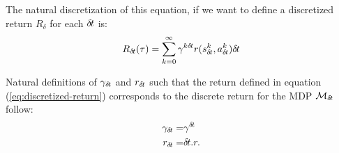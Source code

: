 The natural discretization of this equation, if we want to define a discretized
return $R_\delta$ for each ${\delta\hspace{-.1em}t}$ is:
\begin{equation}
\label{eq:discretized-return}
R_{\delta\hspace{-.1em}t}(\tau) = \sum_{k=0}^\infty\gamma^{k{\delta\hspace{-.1em}t}}
r(s_{\delta\hspace{-.1em}t}^k, a_{\delta\hspace{-.1em}t}^k){\delta\hspace{-.1em}t}
\end{equation}

Natural definitions of $\gamma_{\delta\hspace{-.1em}t}$ and $r_{\delta\hspace{-.1em}t}$ such
that the return defined in equation (\ref{eq:discretized-return}) corresponds
to the discrete return for the MDP ${\cal M}_{\delta\hspace{-.1em}t}$ follow:
\begin{align}
\label{eq:def-gamma}
\gamma_{\delta\hspace{-.1em}t} =& \gamma^{\delta\hspace{-.1em}t}\\
\label{eq:def-reward}
r_{\delta\hspace{-.1em}t} =& {\delta\hspace{-.1em}t} . r.
\end{align}




